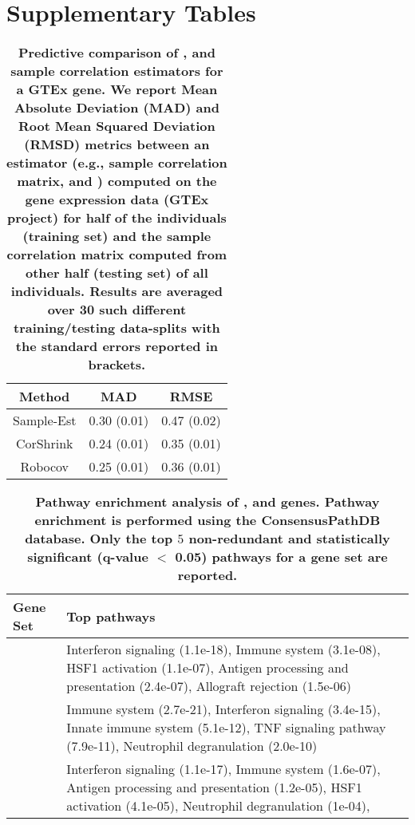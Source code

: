 \clearpage
{}
\setcounter{page}{1}

\section*{Supplementary Tables}

\setcounter{table}{0}
\renewcommand{\thetable}{S\arabic{table}}


\begin{table}[h]
\centering
\caption{\bf{Predictive comparison of \CorShrink{}, \Robocov{} and sample correlation estimators for a GTEx gene. We report Mean Absolute Deviation (MAD) and Root Mean Squared Deviation (RMSD) metrics between an estimator (e.g., sample correlation matrix, \CorShrink{} and \Robocov{}) computed on the gene expression data (GTEx project) for half of the individuals (training set) and the sample correlation matrix computed from other half (testing set) of all individuals. Results are averaged over 30 such different training/testing data-splits with the standard errors reported in brackets.}}
\label{tab:gtex_predictive} 
\begin{tabular}{|c|c|c|} \hline 
Method & MAD & RMSE  \\ \hline 
Sample-Est & 0.30 (0.01)  & 0.47 (0.02)  \\ \hline 
CorShrink & 0.24 (0.01) & 0.35 (0.01)  \\ \hline 
Robocov  & 0.25 (0.01)  & 0.36 (0.01)  \\ 
\hline 
\end{tabular}
\end{table}


\newpage
\begin{table}[h]
\centering
\caption{\bf{Pathway enrichment analysis of  \Robospan{}, \pRobospan{} and \Corspan{} genes. Pathway enrichment is performed using the ConsensusPathDB database\cite{Kamburov2012}. Only the top $5$ non-redundant and statistically significant (q-value $<$ 0.05) pathways for a gene set are reported.}}
\label{tab:pathway} 
\begin{tabular}[c]{|p{2cm}|p{4cm}|}
\toprule
 Gene Set & Top pathways\\ \hline
\multirow{1}{16em}{\Robospan{}}  & Interferon signaling (1.1e-18), Immune system (3.1e-08), HSF1 activation (1.1e-07), Antigen processing and presentation (2.4e-07), Allograft rejection (1.5e-06) \\ \hline

\multirow{1}{16em}{\pRobospan{}}  & Immune system (2.7e-21), Interferon signaling (3.4e-15), Innate immune system (5.1e-12),  TNF signaling pathway (7.9e-11), Neutrophil degranulation (2.0e-10) \\ \hline 

\multirow{1}{16em}{\Corspan{}}  & Interferon signaling  (1.1e-17), Immune system (1.6e-07), Antigen processing and presentation (1.2e-05), HSF1 activation (4.1e-05), Neutrophil degranulation (1e-04),  \\ \hline 
\end{tabular}
\end{table}

